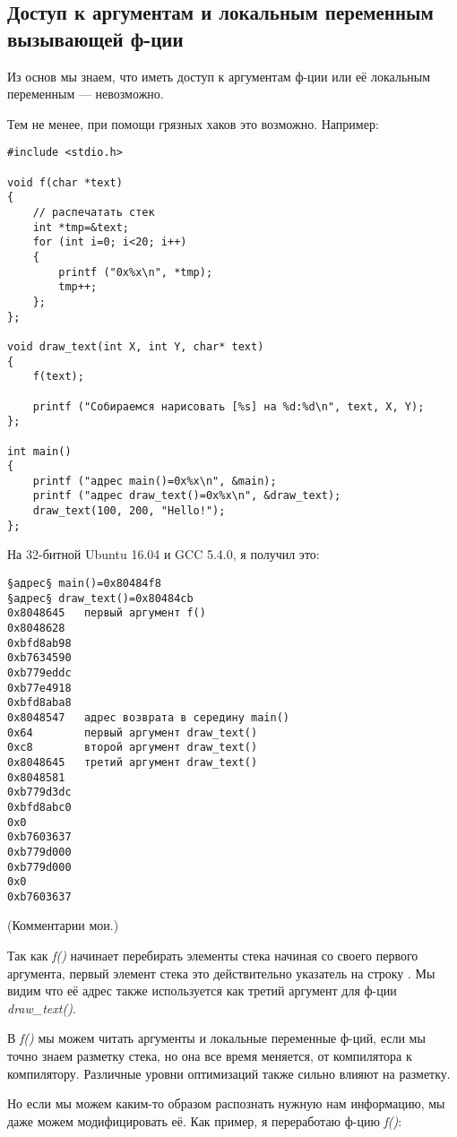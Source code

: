 \subsection{Доступ к аргументам и локальным переменным вызывающей ф-ции}

Из основ \CCpp мы знаем, что иметь доступ к аргументам ф-ции или её локальным переменным --- невозможно.

Тем не менее, при помощи грязных хаков это возможно.
Например:

\begin{lstlisting}[style=customc]
#include <stdio.h>

void f(char *text)
{
	// распечатать стек
	int *tmp=&text;
	for (int i=0; i<20; i++)
	{
		printf ("0x%x\n", *tmp);
		tmp++;
	};
};

void draw_text(int X, int Y, char* text)
{
	f(text);

	printf ("Собираемся нарисовать [%s] на %d:%d\n", text, X, Y);
};

int main()
{
	printf ("адрес main()=0x%x\n", &main);
	printf ("адрес draw_text()=0x%x\n", &draw_text);
	draw_text(100, 200, "Hello!");
};
\end{lstlisting}

На 32-битной Ubuntu 16.04 и GCC 5.4.0, я получил это:

\begin{lstlisting}
§адрес§ main()=0x80484f8
§адрес§ draw_text()=0x80484cb
0x8048645	первый аргумент f()
0x8048628
0xbfd8ab98
0xb7634590
0xb779eddc
0xb77e4918
0xbfd8aba8
0x8048547	адрес возврата в середину main()
0x64		первый аргумент draw_text()
0xc8		второй аргумент draw_text()
0x8048645	третий аргумент draw_text()
0x8048581
0xb779d3dc
0xbfd8abc0
0x0
0xb7603637
0xb779d000
0xb779d000
0x0
0xb7603637
\end{lstlisting}

(Комментарии мои.)

Так как \emph{f()} начинает перебирать элементы стека начиная со своего первого аргумента, первый элемент стека это
действительно указатель на строку .
Мы видим что её адрес также используется как третий аргумент для ф-ции \emph{draw\_text()}.

В \emph{f()} мы можем читать аргументы и локальные переменные ф-ций, если мы точно знаем разметку стека, но она все время
меняется, от компилятора к компилятору.
Различные уровни оптимизаций также сильно влияют на разметку.

Но если мы можем каким-то образом распознать нужную нам информацию, мы даже можем модифицировать её.
Как пример, я переработаю ф-цию \emph{f()}:


